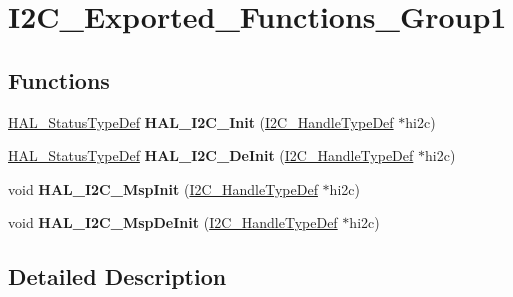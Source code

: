 \hypertarget{group___i2_c___exported___functions___group1}{}\section{I2\+C\+\_\+\+Exported\+\_\+\+Functions\+\_\+\+Group1}
\label{group___i2_c___exported___functions___group1}
\subsection*{Functions}
\begin{DoxyCompactItemize}
\item 
\mbox{\label{group___i2_c___exported___functions___group1_ga9d29159a6da072287fff73743fd93260}} 
\hyperlink{stm32f1xx__hal__def_8h_a63c0679d1cb8b8c684fbb0632743478f}{H\+A\+L\+\_\+\+Status\+Type\+Def} {\bfseries H\+A\+L\+\_\+\+I2\+C\+\_\+\+Init} (\hyperlink{struct_i2_c___handle_type_def}{I2\+C\+\_\+\+Handle\+Type\+Def} $\ast$hi2c)
\item 
\mbox{\label{group___i2_c___exported___functions___group1_gabda634ba18f874775d1262c887d273b4}} 
\hyperlink{stm32f1xx__hal__def_8h_a63c0679d1cb8b8c684fbb0632743478f}{H\+A\+L\+\_\+\+Status\+Type\+Def} {\bfseries H\+A\+L\+\_\+\+I2\+C\+\_\+\+De\+Init} (\hyperlink{struct_i2_c___handle_type_def}{I2\+C\+\_\+\+Handle\+Type\+Def} $\ast$hi2c)
\item 
\mbox{\label{group___i2_c___exported___functions___group1_gabe01a202c27b23fc150aa66af3130073}} 
void {\bfseries H\+A\+L\+\_\+\+I2\+C\+\_\+\+Msp\+Init} (\hyperlink{struct_i2_c___handle_type_def}{I2\+C\+\_\+\+Handle\+Type\+Def} $\ast$hi2c)
\item 
\mbox{\label{group___i2_c___exported___functions___group1_ga2ec8d9b09854c732e2feed549278f048}} 
void {\bfseries H\+A\+L\+\_\+\+I2\+C\+\_\+\+Msp\+De\+Init} (\hyperlink{struct_i2_c___handle_type_def}{I2\+C\+\_\+\+Handle\+Type\+Def} $\ast$hi2c)
\end{DoxyCompactItemize}


\subsection{Detailed Description}
